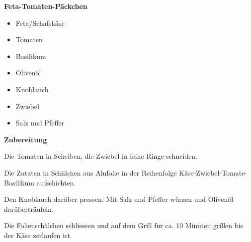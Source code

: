 

\parindent0pt	

\pagestyle{empty}


\textbf{{\LARGE Feta-Tomaten-Päckchen}}%

\hrulefill
\vspace*{\fill}
\begin{multicols}{2}	


\begin{itemize}
\item Feta/Schafskäse
\item Tomaten 
\item Basilikum	
\item Olivenöl
\item Knoblauch
\item Zwiebel
\item Salz und Pfeffer
\end{itemize}
\end{multicols}
\vfill									%

\vspace{2cm}
%



\vfill
\newpage
\textbf{{\LARGE Zubereitung}}%

\hrulefill

\vspace*{\fill}
\begin{multicols}{2}

Die Tomaten in Scheiben, die Zwiebel in feine Ringe schneiden.\newline

Die Zutaten in Schälchen aus Alufolie in der Reihenfolge
Käse-Zwiebel-Tomate-Basilikum aufschichten. \newline

Den Knoblauch darüber pressen.\newline
Mit Salz und Pfeffer würzen und Olivenöl darüberträufeln.\newline

Die Folienschälchen schliessen und auf dem Grill für ca. 10 Minuten
grillen bis der Käse zerlaufen ist.




\end{multicols}
\vfill
